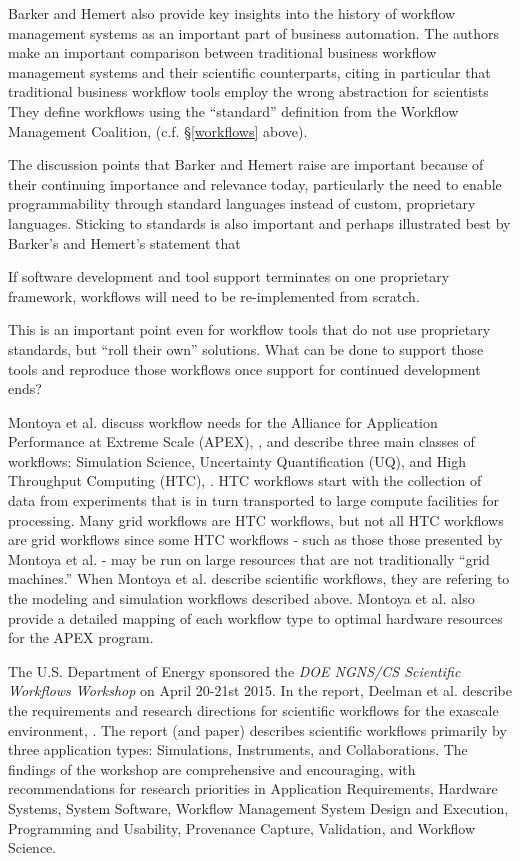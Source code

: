 Barker and Hemert also provide key insights into the history of
workflow management systems as an important part of business
automation. The authors make an important comparison between traditional
business workflow management systems and their scientific counterparts,
citing in particular that traditional business workflow tools employ the
wrong abstraction for scientists They define workflows using the
``standard'' definition from the Workflow Management Coalition, (c.f. \S \ref{workflows} above).

The discussion points that Barker and Hemert raise are important because
of their continuing importance and relevance today, particularly the
need to enable programmability through standard languages instead of
custom, proprietary languages. Sticking to
standards is also important and perhaps illustrated best by Barker's and
Hemert's statement that

\begin{displayquote}
If software development and tool support terminates on one proprietary 
framework, workflows will need to be re-implemented from scratch.
\end{displayquote}

This is an important point even for workflow tools that do not use
proprietary standards, but ``roll their own'' solutions. What can be
done to support those tools and reproduce those workflows once support
for continued development ends?

Montoya et al. discuss workflow needs for the Alliance for Application
Performance at Extreme Scale (APEX), \cite{nersc_apex_2016}, and describe
three main classes of workflows: Simulation Science, Uncertainty
Quantification (UQ), and High Throughput Computing (HTC),
\cite{montoya_apex_2016}.
HTC workflows start with the collection of data from experiments that is in turn
transported to large compute facilities for
processing. Many grid workflows are HTC workflows, but not all HTC
workflows are grid workflows since some HTC workflows - such as those
those presented by Montoya et al. - may be run on large resources that
are not traditionally ``grid machines.'' When Montoya et al. describe scientific workflows,
they are refering to the modeling and simulation workflows described above. Montoya et al. also provide a
detailed mapping of each workflow type to optimal hardware resources for the APEX
program.

The U.S. Department of Energy sponsored the \emph{DOE NGNS/CS Scientific
Workflows Workshop} on April 20-21st 2015. In the report, Deelman et al.
describe the requirements and research directions for scientific
workflows for the exascale environment, \cite{deelman_future_2015}\cite{deelman_future_2017}. The report (and paper) describes scientific workflows primarily by three application types:
Simulations, Instruments, and Collaborations. The findings of the workshop are
comprehensive and encouraging, with recommendations for research
priorities in Application Requirements, Hardware Systems, System
Software, Workflow Management System Design and Execution, Programming and Usability,
Provenance Capture, Validation, and Workflow Science.

